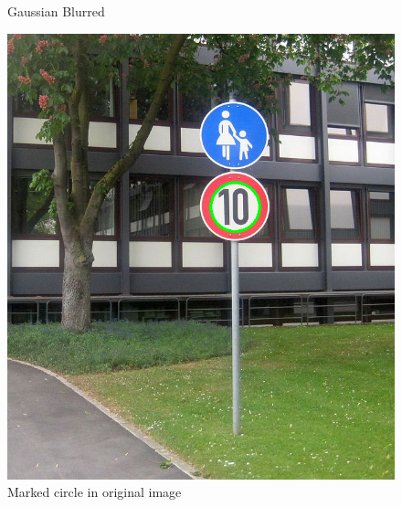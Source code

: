 \begin{figure}[H]
	\caption{Gaussian Blurred}\label{fig:combined_blurred}
	\endminipage\hfill
	\includegraphics[width=\linewidth]{images/detectedcirclescircle.png}
	\caption{Marked circle in original image}\label{fig:detectedcircles}
	\endminipage
	
\end{figure}

